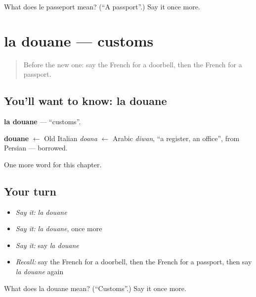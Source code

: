 \begin{tcolorbox}[breakable,colback=teal!4,colframe=teal!35!black,title={Before you move on}]
What does le passeport mean? (\textquotedblleft{}A passport\textquotedblright{}.) Say it once more.
\end{tcolorbox}
\section[la douane]{la douane — customs}

\label{lesson:FR-C164-douane}



\begin{quote}
Before the new one: say the French for a doorbell, then the French for a passport.
\end{quote}

\subsection*{You'll want to know: la douane}
\textbf{la douane} — \textquotedblleft{}customs\textquotedblright{}.

\begin{cousinweb}
\textbf{douane} $\leftarrow$ Old Italian \emph{doana} $\leftarrow$ Arabic \emph{diwan}, \textquotedblleft{}a register, an office\textquotedblright{}, from Persian — borrowed.
\end{cousinweb}

\begin{grammarlens}[title={What you've built}]
One more word for this chapter.
\end{grammarlens}

\subsection*{Your turn}
\begin{itemize}
\raggedright
  \item \emph{Say it:} \emph{la douane}
  \item \emph{Say it:} \emph{la douane}, once more
  \item \emph{Say it:} say \emph{la douane}
  \item \emph{Recall:} say the French for a doorbell, then the French for a passport, then say \emph{la douane} again
\end{itemize}

\begin{tcolorbox}[breakable,colback=teal!4,colframe=teal!35!black,title={Before you move on}]
What does la douane mean? (\textquotedblleft{}Customs\textquotedblright{}.) Say it once more.
\end{tcolorbox}
